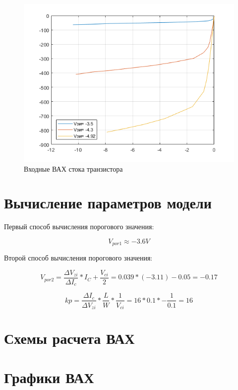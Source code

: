 \documentclass[a4paper,14pt]{article}
\begin{document}
\begin{figure}[H]
	\centering
	\includegraphics[width=0.7\linewidth]{image/graph_2}
	\caption{Входные ВАХ стока транзистора}
	\label{fig:graph2}
\end{figure}

\section{Вычисление параметров модели}

Первый способ вычисления порогового значения:

$$V_{por1} \approx -3.6V$$

Второй способ вычисления порогового значения:

$$V_{por2} = \frac{\Delta V_{zi}}{\Delta I_{c}}*I_C + \frac{V_{ci}}{2} = 0.039*(-3.11) - 0.05 = - 0.17$$

$$kp = \frac{\Delta I_{c}}{\Delta V_{zi}} * \frac{L}{W} * \frac{1}{V_{ci}} =16*0.1* -\frac{1}{0.1} = 16$$
\section{Схемы расчета ВАХ}
\section{Графики ВАХ}
\end{document}
